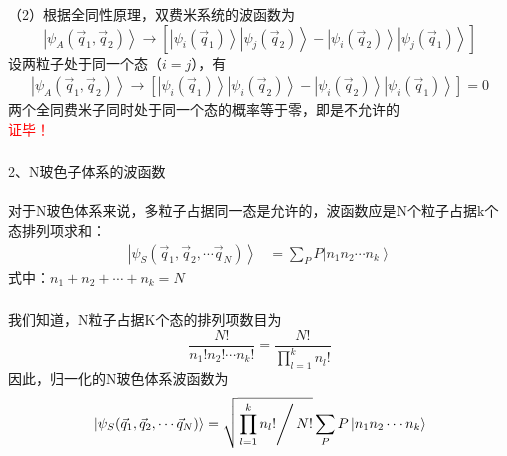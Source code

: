 \begin{frame}[label=current]
  \frametitle{}
  （2）根据全同性原理，双费米系统的波函数为 
  \[\left\vert \psi _A(\vec{q}_1,\vec{q}_2) \right\rangle  \to \left[\left\vert \psi _i(\vec{q}_1)\right\rangle \left\vert \psi _j(\vec{q}_2) \right\rangle  - \left\vert \psi _i(\vec{q}_2)\right\rangle \left\vert \psi _j(\vec{q}_1) \right\rangle\right] \]
  设两粒子处于同一个态（$i = j$），有
  \[
  \begin{aligned}
    \left\vert \psi _A(\vec{q}_1,\vec{q}_2) \right\rangle  \to \left[\left\vert \psi _i(\vec{q}_1)\right\rangle \left\vert \psi _i(\vec{q}_2) \right\rangle  - \left\vert \psi _i(\vec{q}_2)\right\rangle \left\vert \psi _i(\vec{q}_1) \right\rangle\right]  = 0 
  \end{aligned} \]
  两个全同费米子同时处于同一个态的概率等于零，即是不允许的 \\
  \textcolor{red}{证毕！}
\end{frame} 

\begin{frame}[label=current]
  \frametitle{}
2、N玻色子体系的波函数 \\
~~\\ 
对于N玻色体系来说，多粒子占据同一态是允许的，波函数应是N个粒子占据k个态排列项求和：
\[\begin{aligned}
\left\vert \psi _S(\vec{q}_1,\vec{q}_2,\cdots \vec{q}_N) \right\rangle  
 &= \sum_P P \left\vert n_1 n_2\cdots n_k\right\rangle 
\end{aligned}  \]
式中：$n_1 + n_2 + \cdots + n_k =N $
\end{frame} 

\begin{frame}[label=current]
  \frametitle{}
我们知道，N粒子占据K个态的排列项数目为
$$\frac{N!}{n_1 !n_2 ! \cdots n_k !} = \frac{N!}{\prod\limits_{l=1}^{k}n_l !} $$ 
因此，归一化的N玻色体系波函数为
\[
  \left\vert \psi _S(\vec{q}_1,\vec{q}_2,\cdots \vec{q}_N) \right\rangle  
 = \sqrt{\left.\prod\limits_{l=1}^{k}n_l ! \right/ N!} \sum_P P\left\vert n_1 n_2\cdots n_k\right\rangle  \]
\end{frame} 

